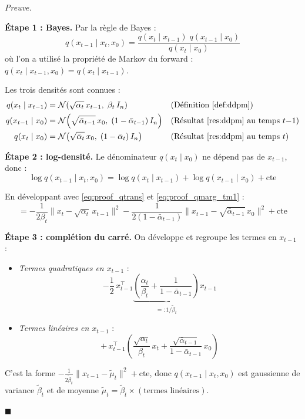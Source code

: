 \documentclass[12pt]{article}
\renewcommand{\qedsymbol}{$\blacksquare$}
\renewenvironment{proof}[1][\proofname]{%
  \par\medskip\noindent
  \textit{\color{proofgray}#1.}\enspace\ignorespaces
}{\hfill\qedsymbol\par\medskip}
\renewcommand{\proofname}{Preuve}
\begin{document}
\begin{proof}
\textbf{Étape 1 : Bayes.} Par la règle de Bayes :
\[
q(x_{t-1} \mid x_t, x_0) = \frac{q(x_t \mid x_{t-1})\; q(x_{t-1} \mid x_0)}{q(x_t \mid x_0)}
\]
où l'on a utilisé la propriété de Markov du forward : $q(x_t \mid x_{t-1}, x_0) = q(x_t \mid x_{t-1})$.

Les trois densités sont connues :
\begin{align}
q(x_t \mid x_{t-1}) &= \mathcal{N}\!\left(\sqrt{\alpha_t}\, x_{t-1},\; \beta_t\, I_n\right) & &\text{(Définition \ref{def:ddpm})}
\label{eq:proof_qtrans} \\
q(x_{t-1} \mid x_0) &= \mathcal{N}\!\left(\sqrt{\bar{\alpha}_{t-1}}\, x_0,\; (1 - \bar{\alpha}_{t-1})\, I_n\right) & &\text{(Résultat \ref{res:ddpm} au temps $t{-}1$)}
\label{eq:proof_qmarg_tm1} \\
q(x_t \mid x_0) &= \mathcal{N}\!\left(\sqrt{\bar{\alpha}_t}\, x_0,\; (1 - \bar{\alpha}_t)\, I_n\right) & &\text{(Résultat \ref{res:ddpm} au temps $t$)}
\label{eq:proof_qmarg_t}
\end{align}

\textbf{Étape 2 : log-densité.} Le dénominateur $q(x_t \mid x_0)$ ne dépend pas de $x_{t-1}$, donc :
\[
\log q(x_{t-1} \mid x_t, x_0) = \log q(x_t \mid x_{t-1}) + \log q(x_{t-1} \mid x_0) + \text{cte}
\]

En développant avec \eqref{eq:proof_qtrans} et \eqref{eq:proof_qmarg_tm1} :
\[
= -\frac{1}{2\beta_t}\|x_t - \sqrt{\alpha_t}\, x_{t-1}\|^2 - \frac{1}{2(1-\bar{\alpha}_{t-1})}\|x_{t-1} - \sqrt{\bar{\alpha}_{t-1}}\, x_0\|^2 + \text{cte}
\]

\textbf{Étape 3 : complétion du carré.} On développe et regroupe les termes en $x_{t-1}$ :
\begin{itemize}
\item \emph{Termes quadratiques en $x_{t-1}$} :
\[
-\frac{1}{2}\,x_{t-1}^\top \underbrace{\left(\frac{\alpha_t}{\beta_t} + \frac{1}{1-\bar{\alpha}_{t-1}}\right)}_{=: 1/\tilde{\beta}_t} x_{t-1}
\]

\item \emph{Termes linéaires en $x_{t-1}$} :
\[
+\, x_{t-1}^\top \left(\frac{\sqrt{\alpha_t}}{\beta_t}\, x_t + \frac{\sqrt{\bar{\alpha}_{t-1}}}{1-\bar{\alpha}_{t-1}}\, x_0\right)
\]
\end{itemize}

C'est la forme $-\frac{1}{2\tilde{\beta}_t}\|x_{t-1} - \tilde{\mu}_t\|^2 + \text{cte}$, donc $q(x_{t-1} \mid x_t, x_0)$ est gaussienne de variance $\tilde{\beta}_t$ et de moyenne $\tilde{\mu}_t = \tilde{\beta}_t \times (\text{termes linéaires})$.


\end{proof}
\end{document}
